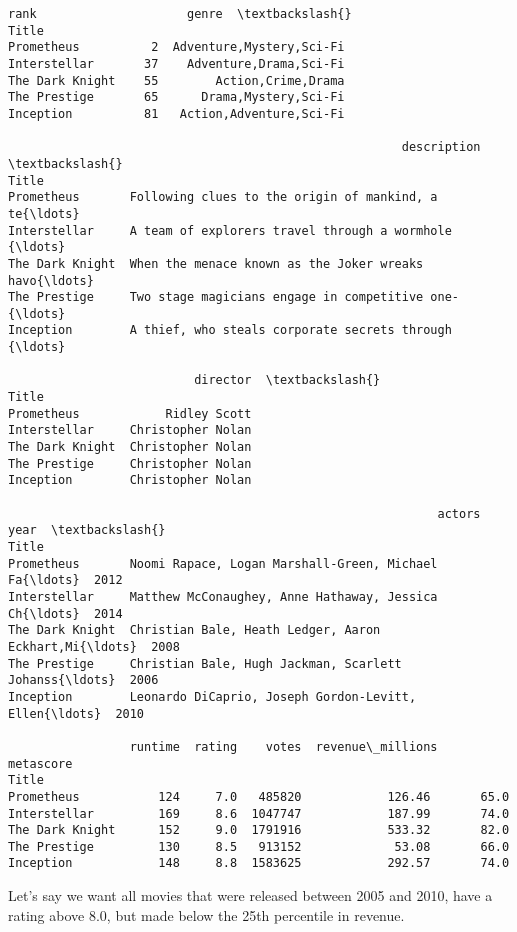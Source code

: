\documentclass[11pt]{article}
\makeatletter
\newcommand{\boxspacing}{\kern\kvtcb@left@rule\kern\kvtcb@boxsep}
\newcommand{\prompt}[4]{
        {\ttfamily\llap{{\color{#2}[#3]:\hspace{3pt}#4}}\vspace{-\baselineskip}}
    }
\makeatother
\begin{document}
            \begin{tcolorbox}[breakable, size=fbox, boxrule=.5pt, pad at break*=1mm, opacityfill=0]
\prompt{Out}{outcolor}{48}{\boxspacing}
\begin{Verbatim}[commandchars=\\\{\}]
                 rank                     genre  \textbackslash{}
Title
Prometheus          2  Adventure,Mystery,Sci-Fi
Interstellar       37    Adventure,Drama,Sci-Fi
The Dark Knight    55        Action,Crime,Drama
The Prestige       65      Drama,Mystery,Sci-Fi
Inception          81   Action,Adventure,Sci-Fi

                                                       description  \textbackslash{}
Title
Prometheus       Following clues to the origin of mankind, a te{\ldots}
Interstellar     A team of explorers travel through a wormhole {\ldots}
The Dark Knight  When the menace known as the Joker wreaks havo{\ldots}
The Prestige     Two stage magicians engage in competitive one-{\ldots}
Inception        A thief, who steals corporate secrets through {\ldots}

                          director  \textbackslash{}
Title
Prometheus            Ridley Scott
Interstellar     Christopher Nolan
The Dark Knight  Christopher Nolan
The Prestige     Christopher Nolan
Inception        Christopher Nolan

                                                            actors  year  \textbackslash{}
Title
Prometheus       Noomi Rapace, Logan Marshall-Green, Michael Fa{\ldots}  2012
Interstellar     Matthew McConaughey, Anne Hathaway, Jessica Ch{\ldots}  2014
The Dark Knight  Christian Bale, Heath Ledger, Aaron Eckhart,Mi{\ldots}  2008
The Prestige     Christian Bale, Hugh Jackman, Scarlett Johanss{\ldots}  2006
Inception        Leonardo DiCaprio, Joseph Gordon-Levitt, Ellen{\ldots}  2010

                 runtime  rating    votes  revenue\_millions  metascore
Title
Prometheus           124     7.0   485820            126.46       65.0
Interstellar         169     8.6  1047747            187.99       74.0
The Dark Knight      152     9.0  1791916            533.32       82.0
The Prestige         130     8.5   913152             53.08       66.0
Inception            148     8.8  1583625            292.57       74.0
\end{Verbatim}
\end{tcolorbox}
        
    Let's say we want all movies that were released between 2005 and 2010,
have a rating above 8.0, but made below the 25th percentile in revenue.
\end{document}
